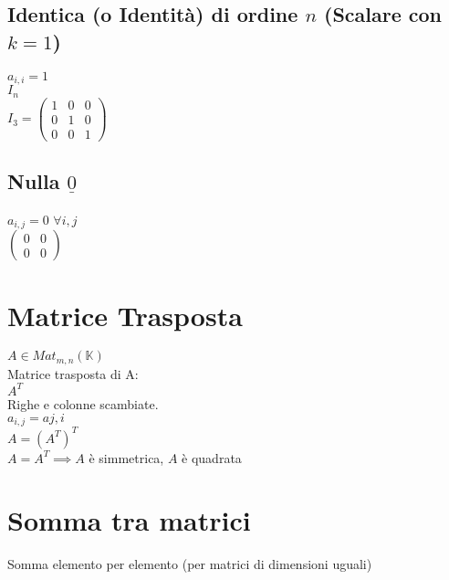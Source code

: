 \documentclass[a4paper, twoside, italian, 11pt]{book}
\newcommand{\K}{\mathbb{K}}
\begin{document}
\subsection{Identica (o Identità) di ordine $n$ (Scalare con $k = 1$)}

$a_{i,i} = 1$ \\

\noindent
$I_n$ \\

\noindent
$I_3 = \begin{pmatrix}
1 & 0 & 0 \\
0 & 1 & 0 \\
0 & 0 & 1
\end{pmatrix}$


\subsection{Nulla $\underline{0}$}

$a_{i,j} = 0$ $\forall i, j$ \\

\noindent
$\begin{pmatrix}
0 & 0 \\
0 & 0
\end{pmatrix}$



\section{Matrice Trasposta}

$A \in Mat_{m,n}(\K)$ \\

\noindent
Matrice trasposta di A: \\
$A^T$ \\

\noindent
Righe e colonne scambiate. \\
$a_{i,j} = a{j,i}$ \\

\noindent
$A = (A^T)^T$ \\

\noindent
$A = A^T \implies A$ è simmetrica, $A$ è quadrata



\section{Somma tra matrici}

Somma elemento per elemento (per matrici di dimensioni uguali) \\
\end{document}
